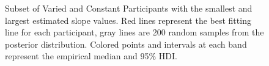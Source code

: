 \documentclass[
  letterpaper,
  DIV=11,
  numbers=noendperiod,
  oneside]{scrartcl}
\begin{document}
\begin{figure}


\caption{\label{fig-e1-indv-slopes}Subset of Varied and Constant
Participants with the smallest and largest estimated slope values. Red
lines represent the best fitting line for each participant, gray lines
are 200 random samples from the posterior distribution. Colored points
and intervals at each band represent the empirical median and 95\% HDI.}

\end{figure}%
\end{document}
